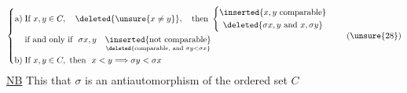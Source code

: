 \[
\left\{
\begin{aligned}
\text{a)}\;&\text{If }x,y\in C,\quad\deleted{\unsure{x\ne y}},\quad\text{then }\left\{
\begin{gathered}
\inserted{x,y\text{ comparable}}\\
\deleted{\sigma x,y\text{ and }x,\sigma y}
\end{gathered}\right.\\
&\text{if and only if }\ \sigma x,y\quad
\underset{\deleted{\text{comparable, and }\sigma y<\sigma x}}{\inserted{\text{not comparable}}}\\
\text{b)}\;&\text{If }x,y\in C,\ \text{then }\ x<y\Longrightarrow\sigma y<\sigma x
\end{aligned}\right.
\tag*{(\unsure{28})}
\]
\uline{NB} This  that $\sigma$ is an antiautomorphism of the ordered set $C$

\endgroup

\clearpage
